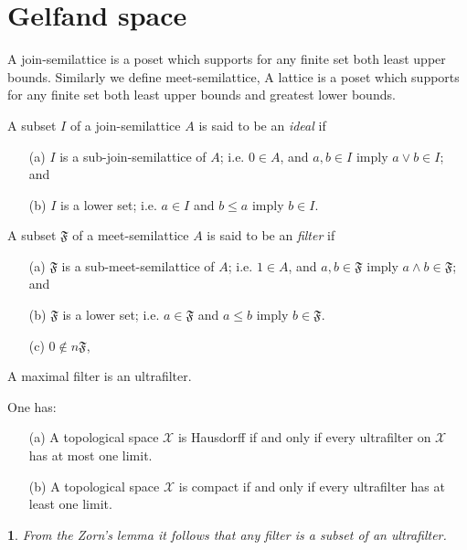 \documentclass{beamer}
\theoremstyle{plain}
\newtheorem{empt}[prop]{}%
\newcommand{\sX}{\mathcal{X}}       %
\begin{document}
\section{Gelfand space}
\begin{frame}
		\begin{definition}\label{lattice_defn}	
	A \alert{join-semilattice} is a poset which supports for any finite set both  least upper bounds. Similarly we define 	\alert{meet-semilattice},	 A \alert{lattice} is a poset which supports for any finite set both  least upper bounds and greatest lower  bounds. 
\end{definition}
\begin{definition}\label{ideal_defn}
	A subset $I$ of a join-semilattice $A$ is said to be an {\it ideal} if
	\begin{enumerate}
		\item [(a)] $I$ is a sub-join-semilattice of $A$; i.e. $0\in A$, and $a, b \in I$ imply  	$a \vee b \in I$; and
		\item [(b)] $I$ is a lower set; i.e. $a \in I$ and $b \le a$ imply $b \in I$.  
	\end{enumerate}
\end{definition}
\begin{definition}\label{filter_defn}
	A subset $\mathfrak F$ of a meet-semilattice $A$ is said to be an {\it filter} if
	\begin{enumerate}
		\item [(a)] $\mathfrak F$ is a sub-meet-semilattice of $A$; i.e. $1\in A$, and $a, b \in \mathfrak F$  imply  	$a \wedge b \in \mathfrak F$; and
		\item [(b)] $\mathfrak F$ is a lower set; i.e. $a \in \mathfrak F$ and $ a\le b$ imply $b \in \mathfrak F$.  
		\item[(c)] $0\notin n \mathfrak F$,
	\end{enumerate}
\end{definition}
\end{frame}
\begin{frame}
		\begin{definition}\label{ultra_filter_defn}
	A maximal filter is an \alert{ultrafilter}.
\end{definition}

\begin{lemma}\label{top_ultra_thm}
	One has:
	\begin{enumerate}
		\item [(a)] 	A topological space $\sX$ is Hausdorff if and only if every ultrafilter on $\sX$ has at most one limit.
		\item[(b)]   	A topological space $\sX$ is compact if and only if every ultrafilter has at least one limit.
	\end{enumerate} 
	
\end{lemma}
\begin{empt}
	From the Zorn's lemma  it follows that any filter is a subset of an ultrafilter.
	\end{empt}

\end{frame}
\end{document}
